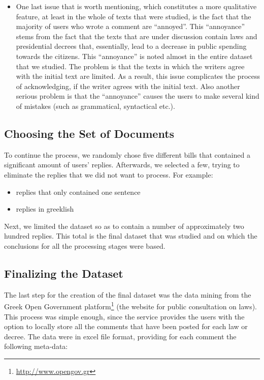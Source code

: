 \begin{itemize}
  \item One last issue that is worth mentioning, which constitutes a more qualitative feature, at least in the whole of texts that were studied, is the fact that the majority of users who wrote a comment are ``annoyed''. This ``annoyance'' stems from the fact that the texts that are under discussion contain laws and presidential decrees that, essentially, lead to a decrease in public spending towards the citizens. This ``annoyance'' is noted almost in the entire dataset that we studied. The problem is that the texts in which the writers agree with the initial text are limited. As a result, this issue complicates the process of acknowledging, if the writer agrees with the initial text. Also another serious problem is that the ``annoyance'' causes the users to make several kind of mistakes (such as grammatical, syntactical etc.).
\end{itemize}


\subsection{Choosing the Set of Documents}\label{312_ref}
To continue the process, we randomly chose five different bills that contained a significant amount of users' replies. Afterwards, we selected a few, trying to eliminate the replies that we did not want to process. For example:\\

\begin{itemize}

	\item replies that only contained one sentence
	\item replies in greeklish\\

\end{itemize}

Next, we limited the dataset so as to contain a number of approximately two hundred replies. This total is the final dataset that was studied and on which the conclusions for all the processing stages were based.

\subsection{Finalizing the Dataset}\label{313_ref}
The last step for the creation of the final dataset was the data mining from the Greek Open Government platform\footnote{\url{http://www.opengov.gr}} (the website for public consultation on laws). This process was  simple enough, since the service provides the users with the option to locally store all the comments that have been posted for each law or decree. The data were in excel file format, providing for each comment the following meta-data:\\

